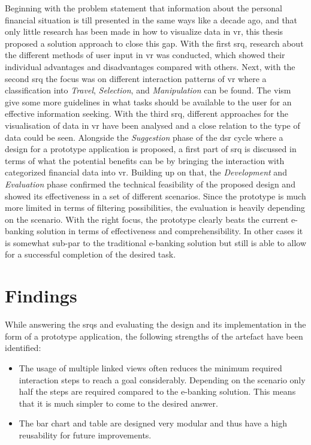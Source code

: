Beginning with the problem statement that information about the personal financial situation is till presented in the same ways like a decade ago, and that only little research has been made in how to visualize data in \gls{vr}, this thesis proposed a solution approach to close this gap. With the first \gls{srq}, research about the different methods of user input in \gls{vr} was conducted, which showed their individual advantages and disadvantages compared with others. Next, with the second \gls{srq} the focus was on different interaction patterns of \gls{vr} where a classification into \textit{Travel}, \textit{Selection}, and \textit{Manipulation} can be found. The \gls{vism} give some more guidelines in what tasks should be available to the user for an effective information seeking. With the third \gls{srq}, different approaches for the visualisation of data in \gls{vr} have been analysed and a close relation to the type of data could be seen. Alongside the \textit{Suggestion} phase of the \gls{dsr} cycle where a design for a prototype application is proposed, a first part of \gls{srq} is discussed in terms of what the potential benefits can be by bringing the interaction with categorized financial data into \gls{vr}. Building up on that, the \textit{Development} and \textit{Evaluation} phase confirmed the technical feasibility of the proposed design and showed its effectiveness in a set of different scenarios. Since the prototype is much more limited in terms of filtering possibilities, the evaluation is heavily depending on the scenario. With the right focus, the prototype clearly beats the current e-banking solution in terms of effectiveness and comprehensibility. In other cases it is somewhat sub-par to the traditional e-banking solution but still is able to allow for a successful completion of the desired task.



\section{Findings}

While answering the \glspl{srq} and evaluating the design and its implementation in the form of a prototype application, the following strengths of the artefact have been identified:
\begin{itemize}[]
	\item The usage of multiple linked views often reduces the minimum required interaction steps to reach a goal considerably. Depending on the scenario only half the steps are required compared to the e-banking solution. This means that it is much simpler to come to the desired answer.
	\item The bar chart and table are designed very modular and thus have a high reusability for future improvements.
\end{itemize}

